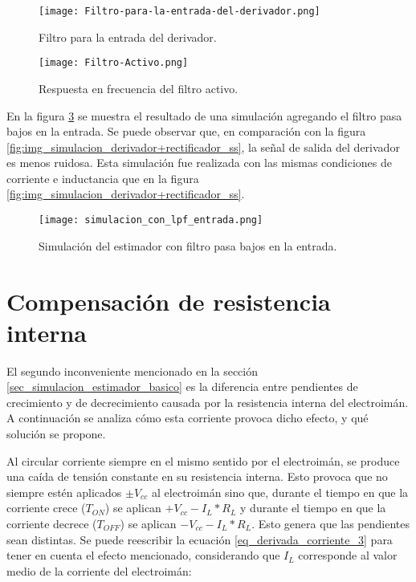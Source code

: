 \begin{figure}[H]
	\centering
	\texttt{[image: Filtro-para-la-entrada-del-derivador.png]}
	\caption{Filtro para la entrada del derivador.}
	\label{fig:img_Filtro-para-la-entrada-del-derivador}
\end{figure}

\begin{figure}[H]
	\centering
	\texttt{[image: Filtro-Activo.png]}
	\caption{Respuesta en frecuencia del filtro activo.}
	\label{fig:img_Respuesta-en-frecuencia-del-filtro-activo}
\end{figure}

En la figura \ref{fig:img_simulacion_lpf_entrada} se muestra el resultado de una simulación agregando el filtro pasa bajos en la entrada. Se puede observar que, en comparación con la figura \ref{fig:img_simulacion_derivador+rectificador_ss}, la señal de salida del derivador es menos ruidosa. Esta simulación fue realizada con las mismas condiciones de corriente e inductancia que en la figura \ref{fig:img_simulacion_derivador+rectificador_ss}.

\begin{figure}[H]
	\centering
	\texttt{[image: simulacion\_con\_lpf\_entrada.png]}
	\caption{Simulación del estimador con filtro pasa 	bajos en la entrada.}
	\label{fig:img_simulacion_lpf_entrada}
\end{figure}



\section{Compensación de resistencia interna}

El segundo inconveniente mencionado en la sección \ref{sec_simulacion_estimador_basico} es la diferencia entre pendientes de crecimiento y de decrecimiento causada por la resistencia interna del electroimán. A continuación se analiza cómo esta corriente provoca dicho efecto, y qué solución se propone.

Al circular corriente siempre en el mismo sentido por el electroimán, se produce una caída de tensión constante en su resistencia interna. Esto provoca que no siempre estén aplicados $\pm V_{cc}$ al electroimán sino que, durante el tiempo en que la corriente crece ($T_{ON}$) se aplican $+V_{cc}-I_L*R_L$ y durante el tiempo en que la corriente decrece ($T_{OFF}$) se aplican $-V_{cc}-I_L*R_L$. Esto genera que las pendientes sean distintas. Se puede reescribir la ecuación \ref{eq_derivada_corriente_3} para tener en cuenta el efecto mencionado, considerando que $I_L$ corresponde al valor medio de la corriente del electroimán:

